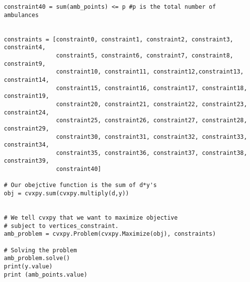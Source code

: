 \documentclass{article}
\newenvironment{code}{\captionsetup{type=listing}}{}
\begin{document}
\begin{code}
\begin{verbatim}
constraint40 = sum(amb_points) <= p #p is the total number of ambulances


constraints = [constraint0, constraint1, constraint2, constraint3, constraint4,
               constraint5, constraint6, constraint7, constraint8, constraint9, 
               constraint10, constraint11, constraint12,constraint13, constraint14, 
               constraint15, constraint16, constraint17, constraint18, constraint19, 
               constraint20, constraint21, constraint22, constraint23, constraint24,
               constraint25, constraint26, constraint27, constraint28, constraint29, 
               constraint30, constraint31, constraint32, constraint33, constraint34, 
               constraint35, constraint36, constraint37, constraint38, constraint39, 
               constraint40]

# Our obejctive function is the sum of d*y's
obj = cvxpy.sum(cvxpy.multiply(d,y))


# We tell cvxpy that we want to maximize objective
# subject to vertices_constraint.
amb_problem = cvxpy.Problem(cvxpy.Maximize(obj), constraints)

# Solving the problem
amb_problem.solve()
print(y.value)
print (amb_points.value)
\end{verbatim}
\end{code}
\end{document}
